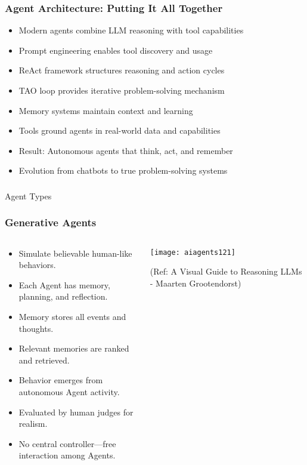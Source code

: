 \begin{frame}[fragile]\frametitle{Agent Architecture: Putting It All Together}
      \begin{itemize}
	  \item Modern agents combine LLM reasoning with tool capabilities
	  \item Prompt engineering enables tool discovery and usage
	  \item ReAct framework structures reasoning and action cycles
	  \item TAO loop provides iterative problem-solving mechanism
	  \item Memory systems maintain context and learning
	  \item Tools ground agents in real-world data and capabilities
	  \item Result: Autonomous agents that think, act, and remember
	  \item Evolution from chatbots to true problem-solving systems
	  \end{itemize}
\end{frame}


\begin{frame}[fragile]\frametitle{}
\begin{center}
{\Large Agent Types}
\end{center}
\end{frame}

\begin{frame}[fragile]\frametitle{Generative Agents}
\begin{columns}
    \begin{column}[T]{0.6\linewidth}
      \begin{itemize}
        \item Simulate believable human-like behaviors.
        \item Each Agent has memory, planning, and reflection.
        \item Memory stores all events and thoughts.
        \item Relevant memories are ranked and retrieved.
        \item Behavior emerges from autonomous Agent activity.
        \item Evaluated by human judges for realism.
        \item No central controller—free interaction among Agents.
      \end{itemize}
    \end{column}
    \begin{column}[T]{0.4\linewidth}
        \begin{center}
        \texttt{[image: aiagents121]}
		
        {\tiny (Ref: A Visual Guide to Reasoning LLMs - Maarten Grootendorst)}
        \end{center}
    \end{column}
\end{columns}
\end{frame}



